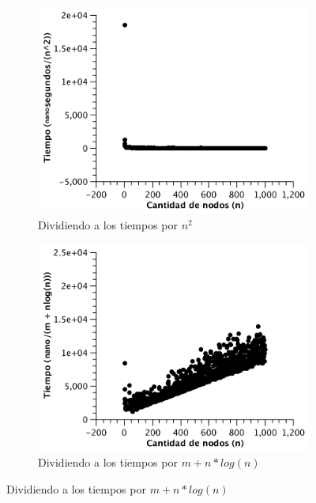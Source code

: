 \begin{figure}[H]
        \centering
        \begin{subfigure}[b]{0.5\textwidth}
                \includegraphics[width=\textwidth]{imagenes/completo-matriz-3.pdf}
                \caption{Dividiendo a los tiempos por $n^2$}
        \end{subfigure}

        \begin{subfigure}[b]{0.5\textwidth}
                \includegraphics[width=\textwidth]{imagenes/completo-matriz-4.pdf}
                \caption{Dividiendo a los tiempos por $m + n*log(n)$}
        \end{subfigure}
\end{figure}

